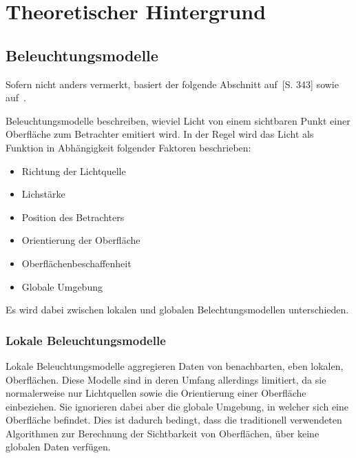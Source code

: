 
\chapter{Theoretischer Hintergrund}
\label{chap:theoretical_background}

\section{Beleuchtungsmodelle}
\label{sec:illumination_models}

Sofern nicht anders vermerkt, basiert der folgende Abschnitt auf~\cite{whitted_improved_1980}[S. 343] sowie auf~\cite{hughes_computer_2013}.

Beleuchtungsmodelle beschreiben, wieviel Licht von einem sichtbaren Punkt einer Oberfläche zum Betrachter emitiert wird. In der Regel wird das Licht als Funktion in Abhängigkeit folgender Faktoren beschrieben:
\begin{itemize}
    \item Richtung der Lichtquelle
    \item Lichstärke
    \item Position des Betrachters
    \item Orientierung der Oberfläche
    \item Oberflächenbeschaffenheit
    \item Globale Umgebung
\end{itemize}

Es wird dabei zwischen lokalen und globalen Belechtungsmodellen unterschieden.

\subsection{Lokale Beleuchtungsmodelle}
\label{subsec:local_illumination_models}

Lokale Beleuchtungsmodelle aggregieren Daten von benachbarten, eben lokalen, Oberflächen. Diese Modelle sind in deren Umfang allerdings limitiert, da sie normalerweise nur Lichtquellen sowie die Orientierung einer Oberfläche einbeziehen. Sie ignorieren dabei aber die globale Umgebung, in welcher sich eine Oberfläche befindet.
Dies ist dadurch bedingt, dass die traditionell verwendeten Algorithmen zur Berechnung der Sichtbarkeit von Oberflächen, über keine globalen Daten verfügen.

